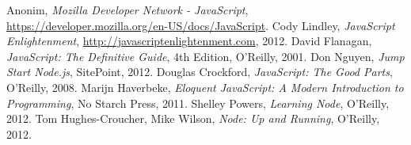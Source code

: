 \begin{thebibliography}{99}

Anonim, \textit{Mozilla Developer Network - JavaScript}, \url{https://developer.mozilla.org/en-US/docs/JavaScript}.
Cody Lindley, \textit{JavaScript Enlightenment}, \url{http://javascriptenlightenment.com}, 2012.
David Flanagan, \textit{JavaScript: The Definitive Guide}, 4th Edition, O'Reilly, 2001.
Don Nguyen, \textit{Jump Start Node.js}, SitePoint, 2012.
Douglas Crockford, \textit{JavaScript: The Good Parts}, O'Reilly, 2008.
Marijn Haverbeke, \textit{Eloquent JavaScript: A Modern Introduction to Programming}, No Starch Press, 2011.
Shelley Powers, \textit{Learning Node}, O'Reilly, 2012.
Tom Hughes-Croucher, Mike Wilson, \textit{Node: Up and Running}, O'Reilly, 2012.
\end{thebibliography}
